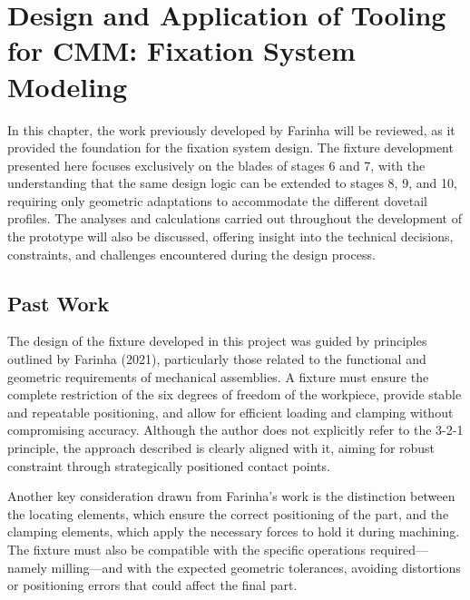 
%

\chapter{Design and Application of Tooling for CMM: Fixation System Modeling}
\label{cha:dig}

In this chapter, the work previously developed by Farinha \cite{Farinha2021} will be reviewed, as it provided the foundation for the fixation system design. 
The fixture development presented here focuses exclusively on the blades of stages 6 and 7, with the understanding that the same design logic can be extended to stages 8, 9, and 10, requiring only geometric adaptations to accommodate the different dovetail profiles.
The analyses and calculations carried out throughout the development of the prototype will also be discussed, offering insight into the technical decisions, constraints, and challenges encountered during the design process.

\section{Past Work}
\label{sec:pastfix}

The design of the fixture developed in this project was guided by principles outlined by Farinha (2021), particularly those related to the functional and geometric requirements of mechanical assemblies. A fixture must ensure the complete restriction of the six degrees of freedom of the workpiece, provide stable and repeatable positioning, and allow for efficient loading and clamping without compromising accuracy. Although the author does not explicitly refer to the 3-2-1 principle, the approach described is clearly aligned with it, aiming for robust constraint through strategically positioned contact points.

Another key consideration drawn from Farinha’s work is the distinction between the locating elements, which ensure the correct positioning of the part, and the clamping elements, which apply the necessary forces to hold it during machining. The fixture must also be compatible with the specific operations required—namely milling—and with the expected geometric tolerances, avoiding distortions or positioning errors that could affect the final part.

